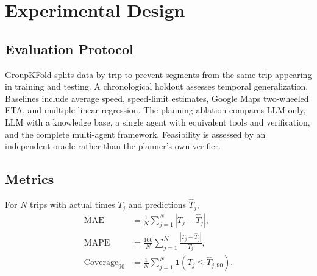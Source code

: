 \section{Experimental Design}
\subsection{Evaluation Protocol}
GroupKFold splits data by trip to prevent segments from the same trip appearing in training and testing. A chronological holdout assesses temporal generalization. Baselines include average speed, speed-limit estimates, Google Maps two-wheeled ETA, and multiple linear regression. The planning ablation compares LLM-only, LLM with a knowledge base, a single agent with equivalent tools and verification, and the complete multi-agent framework. Feasibility is assessed by an independent oracle rather than the planner's own verifier.

\subsection{Metrics}
For $N$ trips with actual times $T_j$ and predictions $\hat T_j$,
\begin{align}
\mathrm{MAE}&=\frac{1}{N}\sum_{j=1}^N|T_j-\hat T_j|,\\
\mathrm{MAPE}&=\frac{100}{N}\sum_{j=1}^N\frac{|T_j-\hat T_j|}{T_j},\\
\mathrm{Coverage}_{90}&=\frac{1}{N}\sum_{j=1}^N\mathbf{1}(T_j\leq\hat T_{j,90}).
\end{align}
